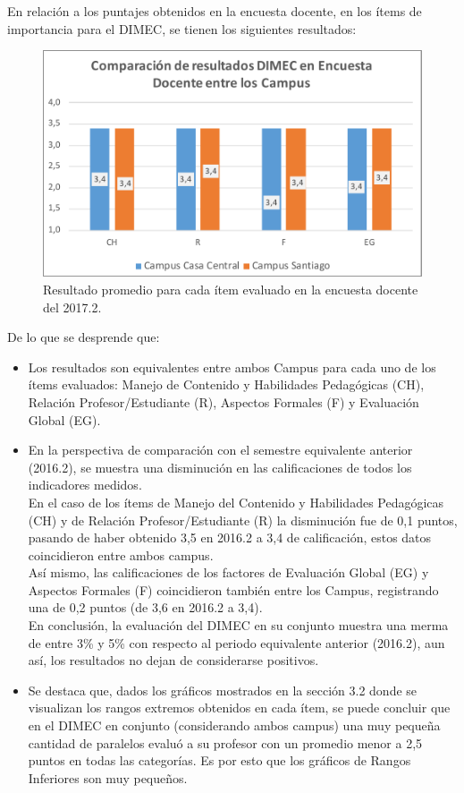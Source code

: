 \documentclass[12pt]{article}
\begin{document}
En relación a los puntajes obtenidos en la encuesta docente, en los ítems de importancia para el DIMEC, se tienen los siguientes resultados: 
\begin{figure}[H]
    \centering
    \includegraphics[width=1\textwidth]{AR3Resultados.pdf}
    \caption{Resultado promedio para cada ítem evaluado en la encuesta docente del 2017.2.}
    \label{fig:resp}
\end{figure}

De lo que se desprende que:
\begin{itemize}
    \item Los resultados son equivalentes entre ambos Campus para cada uno de los ítems evaluados: Manejo de Contenido y Habilidades Pedagógicas (CH), Relación Profesor/Estudiante (R), Aspectos Formales (F) y Evaluación Global (EG).
    \item En la perspectiva de comparación con el semestre equivalente anterior (2016.2), se muestra una disminución en las calificaciones de todos los indicadores medidos. \\ En el caso de los ítems de Manejo del Contenido y Habilidades Pedagógicas (CH) y de Relación Profesor/Estudiante (R) la disminución fue de 0,1 puntos, pasando de haber obtenido 3,5 en 2016.2 a 3,4 de calificación, estos datos coincidieron entre ambos campus. \\ Así mismo, las calificaciones de los factores de Evaluación Global (EG) y Aspectos Formales (F) coincidieron también entre los Campus, registrando una de 0,2 puntos (de 3,6 en 2016.2 a 3,4).\\ En conclusión, la evaluación del DIMEC en su conjunto muestra una merma de entre 3\% y 5\% con respecto al periodo equivalente anterior (2016.2), aun así, los resultados no dejan de considerarse positivos. 
    \item Se destaca que, dados los gráficos mostrados en la sección 3.2 donde se visualizan los rangos extremos obtenidos en cada ítem, se puede concluir que en el DIMEC en conjunto (considerando ambos campus) una muy pequeña cantidad de paralelos evaluó a su profesor con un promedio menor a 2,5 puntos en todas las categorías. Es por esto que los gráficos de Rangos Inferiores son muy pequeños. 
\end{itemize}
\end{document}
